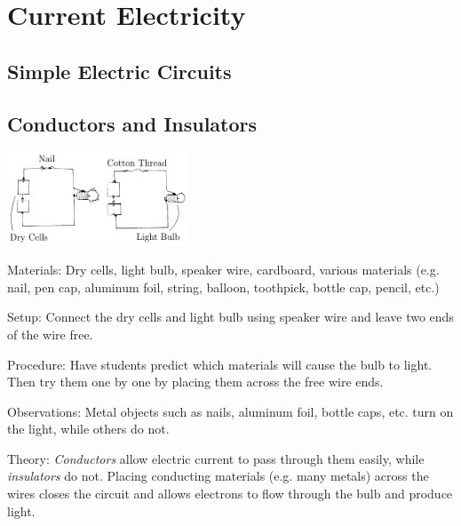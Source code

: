 \section{Current Electricity}
\label{sec:ii-current-electricity}

\begin{multicols}{2}


\section*{Simple Electric Circuits}


\subsection{Conductors and Insulators}

\begin{center}
\includegraphics[width=0.4\textwidth]{./img/conductors-insulators.png}
\end{center}

\begin{description*}
\item[Materials:]{Dry cells, light bulb, speaker wire, cardboard, various materials (e.g. nail, pen cap, aluminum foil, string, balloon, toothpick, bottle cap, pencil, etc.)}
\item[Setup:]{Connect the dry cells and light bulb using speaker wire and leave two ends of the wire free.}
\item[Procedure:]{Have students predict which materials will cause the bulb to light. Then try them one by one by placing them across the free wire ends.}
\item[Observations:]{Metal objects such as nails, aluminum foil, bottle caps, etc. turn on the light, while others do not.}
\item[Theory:]{\emph{Conductors} allow electric current to pass through them easily, while \emph{insulators} do not. Placing conducting materials (e.g. many metals) across the wires closes the circuit and allows electrons to flow through the bulb and produce light.}
\end{description*}


\end{multicols}
